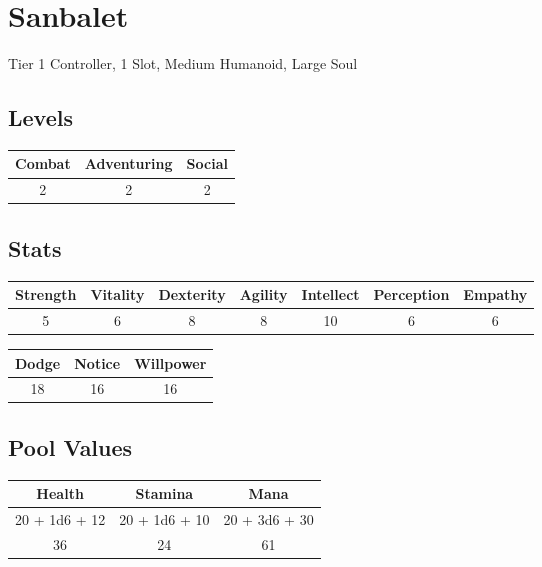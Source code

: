 \section{Sanbalet}\label{creature:sanbalet}
Tier 1 Controller, 1 Slot, Medium Humanoid, Large Soul\\

\subsection{Levels}
\begin{minipage}[H]{1\textwidth}
	\centering
	\begin{tabular}[c]{|c | c | c|}
		\hline
		Combat & Adventuring & Social\\
		\hline
		2 & 2 & 2\\
		\hline
	\end{tabular}
\end{minipage}

\subsection{Stats}
\begin{minipage}[H]{1\textwidth}
	\centering
	\begin{tabular}[c]{|c | c | c | c | c | c | c|}
		\hline
		Strength & Vitality & Dexterity & Agility & Intellect & Perception & Empathy\\
		\hline
		5 & 6 & 8 & 8 & 10 & 6 & 6\\
		\hline
	\end{tabular}
\end{minipage}

\begin{minipage}[H]{1\textwidth}
	\centering
	\begin{tabular}[c]{|c | c | c|}
		\hline
		Dodge & Notice & Willpower\\
		\hline
		18 & 16 & 16\\
		\hline
	\end{tabular}
\end{minipage}

\subsection{Pool Values}
\begin{minipage}[H]{1\textwidth}
	\centering
	\begin{tabular}[c]{|c | c | c|}
		\hline
		Health & Stamina & Mana\\
		\hline
		20 + 1d6 + 12 & 20 + 1d6 + 10 & 20 + 3d6 + 30 \\
		36 & 24 & 61\\
		\hline
	\end{tabular}
\end{minipage}

